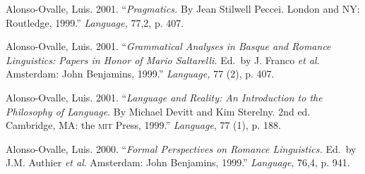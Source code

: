 \documentclass[11pt]{article}
\begin{document}
Alonso-Ovalle, Luis. 2001. ``{\it Pragmatics.} By Jean Stilwell Peccei. London and NY: Routledge, 1999.'' {\it Language,} 77,2, p. 407.

Alonso-Ovalle, Luis. 2001. ``{\it Grammatical Analyses in Basque and Romance Linguistics: Papers in Honor of Mario Saltarelli.} Ed.\ by J. Franco \textit{et al}. Amsterdam: John Benjamins, 1999.'' {\it Language,} 77 (2), p. 407.

Alonso-Ovalle, Luis. 2001. ``{\it Language and Reality: An Introduction to the Philosophy of Language}. By  Michael Devitt and Kim Sterelny. 2nd ed. Cambridge, MA: the \textsc{mit} Press, 1999.'' {\it Language}, 77 (1), p. 188.

Alonso-Ovalle, Luis. 2000. ``{\it Formal Perspectives on Romance Linguistics.} Ed.\ by J.M. Authier \textit{et al}. Amsterdam: John Benjamins, 1999.'' {\it Language}, 76,4, p. 941.
 





\end{document}
